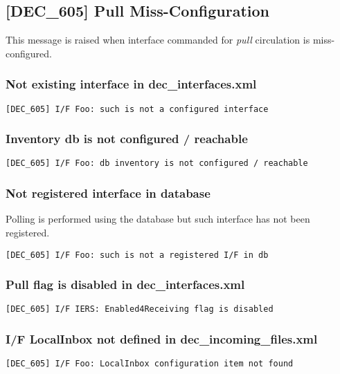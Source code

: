 \documentclass[dec_sum_main.tex]{subfiles}
\begin{document}
\label{DEC605}
\subsection{[DEC\_605] Pull Miss-Configuration}
This message is raised when interface commanded for \textit{pull} circulation is miss-configured.

\subsubsection{Not existing interface in dec\_interfaces.xml }
\begin{verbatim}
[DEC_605] I/F Foo: such is not a configured interface
\end{verbatim}

\subsubsection{Inventory db is not configured / reachable }
\begin{verbatim}
[DEC_605] I/F Foo: db inventory is not configured / reachable
\end{verbatim}

\subsubsection{Not registered interface in database }
Polling is performed using the database but such interface has not been registered.
\begin{verbatim}
[DEC_605] I/F Foo: such is not a registered I/F in db
\end{verbatim}

\subsubsection{Pull flag is disabled in  dec\_interfaces.xml }
\begin{verbatim}
[DEC_605] I/F IERS: Enabled4Receiving flag is disabled
\end{verbatim}

\subsubsection{I/F LocalInbox not defined in  dec\_incoming\_files.xml }
\begin{verbatim}
[DEC_605] I/F Foo: LocalInbox configuration item not found
\end{verbatim}
\end{document}
